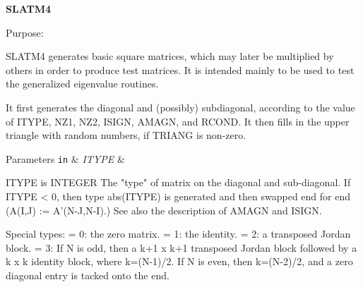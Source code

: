 {\bfseries S\+L\+A\+T\+M4} 

\begin{DoxyParagraph}{Purpose\+: }
\begin{DoxyVerb} SLATM4 generates basic square matrices, which may later be
 multiplied by others in order to produce test matrices.  It is
 intended mainly to be used to test the generalized eigenvalue
 routines.

 It first generates the diagonal and (possibly) subdiagonal,
 according to the value of ITYPE, NZ1, NZ2, ISIGN, AMAGN, and RCOND.
 It then fills in the upper triangle with random numbers, if TRIANG is
 non-zero.\end{DoxyVerb}
 
\end{DoxyParagraph}

\begin{DoxyParams}[1]{Parameters}
\mbox{\tt in}  & {\em I\+T\+Y\+P\+E} & \begin{DoxyVerb}          ITYPE is INTEGER
          The "type" of matrix on the diagonal and sub-diagonal.
          If ITYPE < 0, then type abs(ITYPE) is generated and then
             swapped end for end (A(I,J) := A'(N-J,N-I).)  See also
             the description of AMAGN and ISIGN.

          Special types:
          = 0:  the zero matrix.
          = 1:  the identity.
          = 2:  a transposed Jordan block.
          = 3:  If N is odd, then a k+1 x k+1 transposed Jordan block
                followed by a k x k identity block, where k=(N-1)/2.
                If N is even, then k=(N-2)/2, and a zero diagonal entry
                is tacked onto the end.


\end{DoxyVerb}
\end{DoxyParams}
